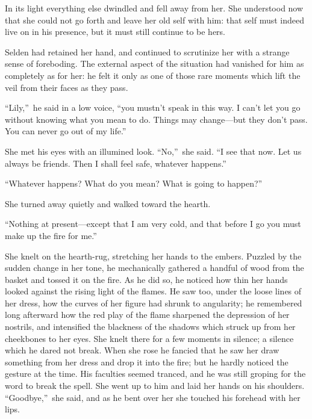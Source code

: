 \documentclass[12pt,a4paper]{book}
\begin{document}
In its light everything else dwindled and fell away from her. She
understood now that she could not go forth and leave her old self
with him: that self must indeed live on in his presence, but it
must still continue to be hers.





Selden had retained her hand, and continued to scrutinize her
with a strange sense of foreboding. The external aspect of the
situation had vanished for him as completely as for her: he felt
it only as one of those rare moments which lift the veil from
their faces as they pass.





``Lily,''\ he said in a low voice, ``you mustn't speak in this way. I
can't let you go without knowing what you mean to do. Things may
change---but they don't pass. You can never go out of my life.''





She met his eyes with an illumined look. ``No,''\ she said. ``I see
that now. Let us always be friends. Then I shall feel safe,
whatever happens.''





``Whatever happens? What do you mean? What is going to happen?''





She turned away quietly and walked toward the hearth.





``Nothing at present---except that I am very cold, and that before
I go you must make up the fire for me.''





She knelt on the hearth-rug, stretching her hands to the embers. 
Puzzled by the sudden change in her tone, he mechanically
gathered a handful of wood from the basket and tossed it on the
fire. As he did so, he noticed how thin her hands looked against
the rising light of the flames. He saw too, under the loose lines
of her dress, how the curves of her figure had shrunk to
angularity; he remembered long afterward how the red play of the
flame sharpened the depression of her nostrils, and intensified
the blackness of the shadows which struck up from her cheekbones
to her eyes. She knelt there for a few moments in
silence; a silence which he dared not break. When she rose he
fancied that he saw her draw something from her dress and drop it
into the fire; but he hardly noticed the gesture at the time. His
faculties seemed tranced, and he was still groping for the word
to break the spell. She went up to him and laid her hands on his
shoulders. ``Goodbye,''\ she said, and as he bent over her she
touched his forehead with her lips.
\end{document}
